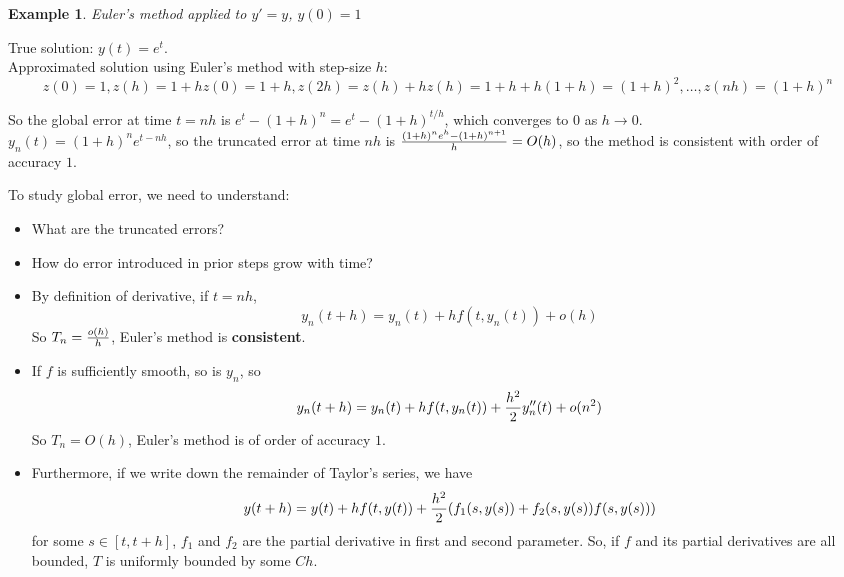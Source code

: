\documentclass[20pt]{article} %
\theoremstyle{break}
\newtheorem{exa}[definition]{Example}
\begin{document}
\newpage

\begin{exa} Euler's method applied to $y'=y$, $y(0)=1$\end{exa}

True solution: $y(t)=e^t$.\\

Approximated solution using Euler's method with step-size $h$:
\[z(0)=1, z(h)=1+hz(0)=1+h, z(2h)=z(h)+hz(h)=1+h+h(1+h)=(1+h)^2, \dots, z(nh)=(1+h)^n\]

So the global error at time $t=nh$ is $e^t-(1+h)^n=e^t-(1+h)^{t/h}$, which converges to $0$ as $h\rightarrow 0$.\\

$y_n(t)=(1+h)^ne^{t-nh}$, so the truncated error at time $nh$ is ${(1+h)^ne^h-(1+h)^{n+1}\over h}=O(h)$, so the method is consistent with order of accuracy $1$.\\


To study global error, we need to understand:

\begin{itemize}
\item What are the truncated errors?
\item How do error introduced in prior steps grow with time?
\end{itemize}

\newpage

\begin{itemize}
\item By definition of derivative, if $t=nh$,
\[y_n(t+h)=y_n(t)+hf(t, y_n(t))+o(h)\]
So $T_n={o(h)\over h}$, Euler's method is {\bf consistent}.
\item If $f$ is sufficiently smooth, so is $y_n$, so
\[y_n(t+h)=y_n(t)+hf(t, y_n(t))+{h^2\over 2}y''_n(t)+o(n^2)\]
So $T_n=O(h)$, Euler's method is of order of accuracy $1$.
\item Furthermore, if we write down the remainder of Taylor's series, we have
\[y(t+h)=y(t)+hf(t, y(t))+{h^2\over 2}(f_1(s, y(s))+f_2(s, y(s))f(s, y(s)))\]
for some $s\in [t, t+h]$, $f_1$ and $f_2$ are the partial derivative in first and second parameter. So,  if $f$ and its partial derivatives are all bounded, $T$ is uniformly bounded by some $Ch$.
\end{itemize}
\end{document}
